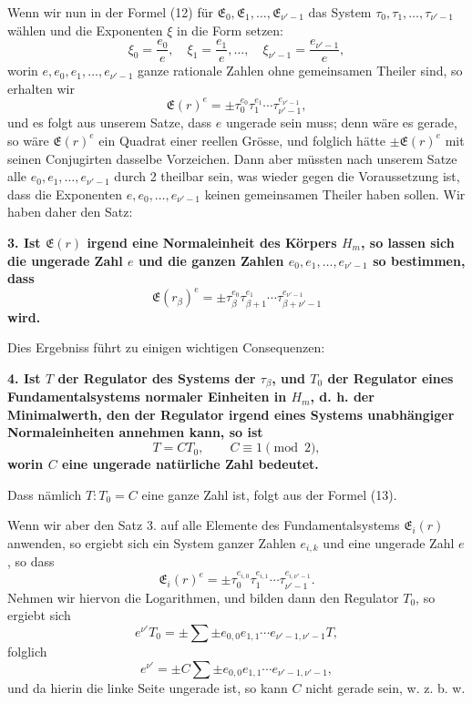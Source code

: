 \documentclass[11pt]{article}
\begin{document}
Wenn wir nun in der Formel (12) für $\mathfrak E_0,\mathfrak E_1,\ldots,\mathfrak E_{\nu'-1}$ das System $\tau_0,\tau_1,\ldots,\tau_{\nu'-1}$ wählen und die Exponenten $\xi$ in die Form setzen:
\[
\xi_0=\frac{e_0}{e},\quad \xi_1=\frac{e_1}{e},\ldots,\quad \xi_{\nu'-1}=\frac{e_{\nu'-1}}{e},
\]
worin $e,e_0,e_1,\ldots,e_{\nu'-1}$ ganze rationale Zahlen ohne gemeinsamen Theiler sind, so erhalten wir
\[
\mathfrak E(r)^e=\pm\tau_0^{e_0}\tau_1^{e_1}\cdots\tau_{\nu'-1}^{e_{\nu'-1}},
\]
und es folgt aus unserem Satze, dass $e$ ungerade sein muss; denn wäre es gerade, so wäre $\mathfrak E(r)^e$ ein Quadrat einer reellen Grösse, und folglich hätte $\pm\mathfrak E(r)^e$ mit seinen Conjugirten dasselbe Vorzeichen. Dann aber müssten nach unserem Satze alle $e_0,e_1,\ldots,e_{\nu'-1}$ durch 2 theilbar sein, was wieder gegen die Voraussetzung ist, dass die Exponenten $e,e_0,\ldots,e_{\nu'-1}$ keinen gemeinsamen Theiler haben sollen. Wir haben daher den Satz:

\begin{center}\textbf{3. Ist $\mathfrak E(r)$ irgend eine Normaleinheit des Körpers $H_m$, so lassen sich die ungerade Zahl $e$ und die ganzen Zahlen $e_0,e_1,\ldots,e_{\nu'-1}$ so bestimmen, dass}
\[
\mathfrak E(r_\beta)^e=\pm\tau_\beta^{e_0}\tau_{\beta+1}^{e_1}\cdots\tau_{\beta+\nu'-1}^{e_{\nu'-1}}
\tag{20}
\]
\textbf{wird.}\end{center}

Dies Ergebniss führt zu einigen wichtigen Consequenzen:

\begin{center}\textbf{4. Ist $T$ der Regulator des Systems der $\tau_\beta$, und $T_0$ der Regulator eines Fundamentalsystems normaler Einheiten in $H_m$, d. h. der Minimalwerth, den der Regulator irgend eines Systems unabhängiger Normaleinheiten annehmen kann, so ist}
\[
T=CT_0,\qquad C\equiv1\pmod2,
\tag{21}
\]
\textbf{worin $C$ eine ungerade natürliche Zahl bedeutet.}\end{center}

Dass nämlich $T:T_0=C$ eine ganze Zahl ist, folgt aus der Formel (13).

Wenn wir aber den Satz 3. auf alle Elemente des Fundamentalsystems $\mathfrak E_i(r)$ anwenden, so ergiebt sich ein System ganzer Zahlen $e_{i,k}$ und eine ungerade Zahl $e$, so dass
\[
\mathfrak E_i(r)^e=\pm\tau_0^{e_{i,0}}\tau_1^{e_{i,1}}\cdots\tau_{\nu'-1}^{e_{i,\nu'-1}}.
\]
Nehmen wir hiervon die Logarithmen, und bilden dann den Regulator $T_0$, so ergiebt sich
\[
e^{\nu'}T_0=\pm\sum\pm e_{0,0}e_{1,1}\cdots e_{\nu'-1,\nu'-1}T,
\]
folglich
\[
e^{\nu'}=\pm C\sum\pm e_{0,0}e_{1,1}\cdots e_{\nu'-1,\nu'-1},
\]
und da hierin die linke Seite ungerade ist, so kann $C$ nicht gerade sein, w. z. b. w.
\end{document}
